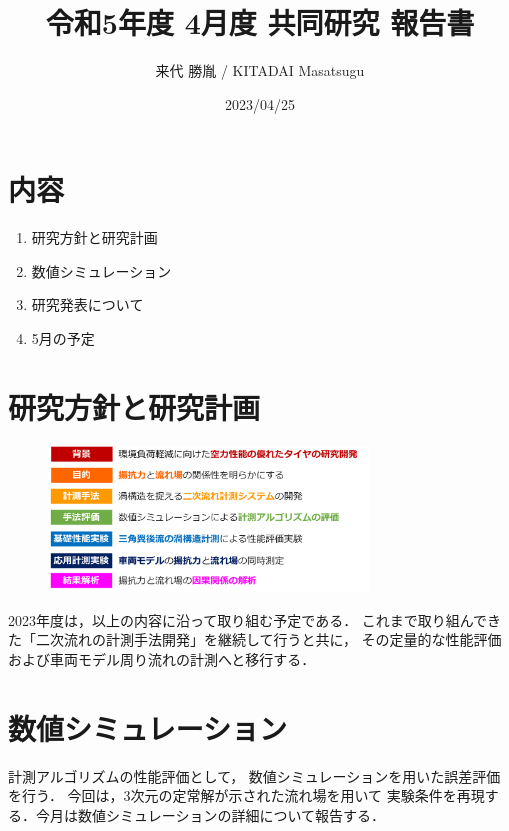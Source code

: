 \documentclass[twocolumn,a4j]{jsarticle}
\author{来代 勝胤 / KITADAI Masatsugu}
\title{令和5年度 4月度 共同研究 報告書}
\date{2023/04/25}
\begin{document}
\columnseprule=0.1mm
\maketitle

\section*{内容}
\begin{enumerate}[1.]
  \item 研究方針と研究計画
  \item 数値シミュレーション
  \item 研究発表について
  \item 5月の予定
\end{enumerate}

\section{研究方針と研究計画}
\begin{figure}[htbp]
  \footnotesize
  \begin{center}
    \includegraphics[width=85mm]{../images/schedule_2023.png}
  \end{center}
\end{figure}
2023年度は，以上の内容に沿って取り組む予定である．
これまで取り組んできた「二次流れの計測手法開発」を継続して行うと共に，
その定量的な性能評価および車両モデル周り流れの計測へと移行する．

\section{数値シミュレーション}
計測アルゴリズムの性能評価として，
数値シミュレーションを用いた誤差評価を行う．
今回は，3次元の定常解が示された流れ場を用いて
実験条件を再現する．今月は数値シミュレーションの詳細について報告する．\\
\end{document}
